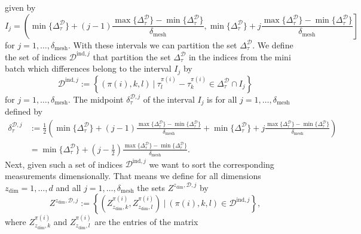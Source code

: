 \documentclass[11pt,titlepage]{article}
\theoremstyle{definition}
\theoremstyle{remark}
\begin{document}
	given by
	\[I_j = \left(\min\{\Delta^\mathcal{D}_\tau\} + (j-1)\frac{\max\{\Delta^\mathcal{D}_\tau\}- \min\{\Delta^\mathcal{D}_\tau\}}{\delta_\mathrm{mesh}}, \min\{\Delta^\mathcal{D}_\tau\} + j\frac{\max\{\Delta^\mathcal{D}_\tau\}- \min\{\Delta^\mathcal{D}_\tau\}}{\delta_\mathrm{mesh}}\right]\]
	for $j=1,\ldots,\delta_\mathrm{mesh}$. With these intervals we can partition the set $\Delta_\tau^\mathcal{D}$. 
	We define the set of indices $\mathcal{D}^{\mathrm{ind},j}$ that partition the set $\Delta_\tau^\mathcal{D}$ in the indices from the mini batch which differences belong to the interval $I_j$ by
	\[\mathcal{D}^{\mathrm{ind},j}:=\left\{(\pi(i),k,l)\ \vert\ \tau^{\pi(i)}_l - \tau^{\pi(i)}_k\in\Delta^\mathcal{D}_\tau\cap I_j\right\}\]
	for $j=1,\ldots,\delta_\mathrm{mesh}$. 
	The midpoint $\delta_\tau^{\mathcal{D},j}$ of the interval $I_j$ is for all $j=1,\ldots,\delta_\mathrm{mesh}$ defined by
	\begin{align*}
		\delta_\tau^{\mathcal{D},j} &:= \frac{1}{2}\left(\min\{\Delta^\mathcal{D}_\tau\} + (j-1)\frac{\max\{\Delta^\mathcal{D}_\tau\}- \min\{\Delta^\mathcal{D}_\tau\}}{\delta_\mathrm{mesh}} + \min\{\Delta^\mathcal{D}_\tau\} + j\frac{\max\{\Delta^\mathcal{D}_\tau\}- \min\{\Delta^\mathcal{D}_\tau\}}{\delta_\mathrm{mesh}}\right)\\
		&= \min\{\Delta^\mathcal{D}_\tau\} + \left(j-\frac{1}{2}\right)\frac{\max\{\Delta^\mathcal{D}_\tau\}- \min\{\Delta^\mathcal{D}_\tau\}}{\delta_\mathrm{mesh}}.
	\end{align*}
	Next, given such a set of indices $\mathcal{D}^{\mathrm{ind},j}$ we want to sort the corresponding measurements dimensionally. That means we define for all dimensions $z_\mathrm{dim} = 1,\ldots, d$ and all $j=1,\ldots, \delta_\mathrm{mesh}$ the sets $Z^{z_\mathrm{dim},\mathcal{D},j}$ by
	\[Z^{z_\mathrm{dim},\mathcal{D},j}:=\left\{\left(Z_{z_\mathrm{dim},k}^{\pi(i)}, Z_{z_\mathrm{dim},l}^{\pi(i)}\right)\ \vert\ (\pi(i),k,l)\in \mathcal{D}^{\mathrm{ind},j}\right\},\]
	where $Z_{z_\mathrm{dim},k}^{\pi(i)}$ and $Z_{z_\mathrm{dim},l}^{\pi(i)}$ are the entries of the matrix 
\end{document}

